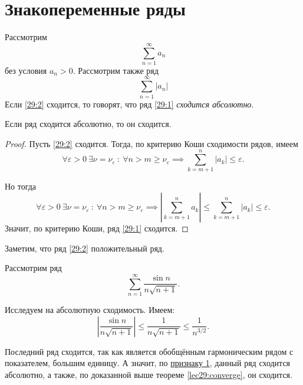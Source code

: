 \documentclass[../../main.tex]{subfiles}
\begin{document}
	\section{Знакопеременные ряды}
	
	Рассмотрим 
	\begin{equation}
		\sum_{n = 1}^\infty a_n
		\label{29:1}
	\end{equation}
	без условия $a_n > 0$. Рассмотрим также ряд
	\begin{equation}
		\sum_{n = 1}^\infty |a_n|
		\label{29:2}
	\end{equation}
	Если \eqref{29:2} сходится, то говорят, что ряд \eqref{29:1} \emph{сходится абсолютно}.
	
	\begin{thm}\label{lec29:converge}
		Если ряд сходится абсолютно, то он сходится.
	\end{thm}
	\begin{proof}
		Пусть \eqref{29:2} сходится. Тогда, по критерию Коши сходимости рядов, имеем
		\[\forall \varepsilon > 0\ \exists\nu = \nu_\varepsilon\ \colon\ \forall n > m \geqslant \nu_\varepsilon \implies \sum_{k = m + 1}^n |a_k|\leqslant\varepsilon.\]
		
		Но тогда
		\[\forall \varepsilon > 0\ \exists\nu = \nu_\varepsilon\ \colon\ \forall n > m \geqslant \nu_\varepsilon \implies \left|\sum_{k = m + 1}^n a_k\right|\leqslant\sum_{k = m + 1}^n |a_k|\leqslant\varepsilon.\]
		Значит, по критерию Коши, ряд \eqref{29:1} сходится.
	\end{proof}

	Заметим, что ряд \eqref{29:2} положительный ряд.
	
	\begin{example}
		Рассмотрим ряд
		\[\sum_{n = 1}^\infty \frac{\sin n}{n\sqrt{n + 1}}.\]
		
		Исследуем на абсолютную сходимость. Имеем:
		\[\left|\frac{\sin n}{n\sqrt{n + 1}}\right|\leqslant\frac{1}{n\sqrt{n + 1}}\leqslant\frac{1}{n^{3/2}}.\]
		
		Последний ряд сходится, так как является обобщённым гармоническим рядом с показателем, большим единицу. А значит, по \hyperref[lec26:comp_test_1]{признаку 1\textdegree}, данный ряд сходится абсолютно, а также, по доказанной выше теореме \ref{lec29:converge}, он сходится.
	\end{example}
\end{document}
